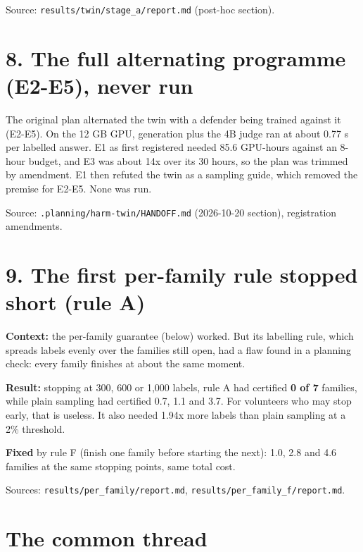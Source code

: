 \documentclass[11pt]{article}
\begin{document}
Source: \texttt{results/\allowbreak twin/\allowbreak stage\_\allowbreak a/\allowbreak report.md} (post-hoc section).


\section*{8. The full alternating programme (E2-E5), never run}

The original plan alternated the twin with a defender being trained against it (E2-E5). On the 12 GB GPU, generation plus the 4B judge ran at about 0.77 s per labelled answer. E1 as first registered needed 85.6 GPU-hours against an 8-hour budget, and E3 was about 14x over its 30 hours, so the plan was trimmed by amendment. E1 then refuted the twin as a sampling guide, which removed the premise for E2-E5. None was run.


Source: \texttt{.planning/\allowbreak harm-twin/\allowbreak HANDOFF.md} (2026-10-20 section), registration amendments.


\section*{9. The first per-family rule stopped short (rule A)}

\textbf{Context:} the per-family guarantee (below) worked. But its labelling rule, which spreads labels evenly over the families still open, had a flaw found in a planning check: every family finishes at about the same moment.


\textbf{Result:} stopping at 300, 600 or 1,000 labels, rule A had certified \textbf{0 of 7} families, while plain sampling had certified 0.7, 1.1 and 3.7. For volunteers who may stop early, that is useless. It also needed 1.94x more labels than plain sampling at a 2\% threshold.


\textbf{Fixed} by rule F (finish one family before starting the next): 1.0, 2.8 and 4.6 families at the same stopping points, same total cost.


Sources: \texttt{results/\allowbreak per\_\allowbreak family/\allowbreak report.md}, \texttt{results/\allowbreak per\_\allowbreak family\_\allowbreak f/\allowbreak report.md}.


\section*{The common thread}
\end{document}

